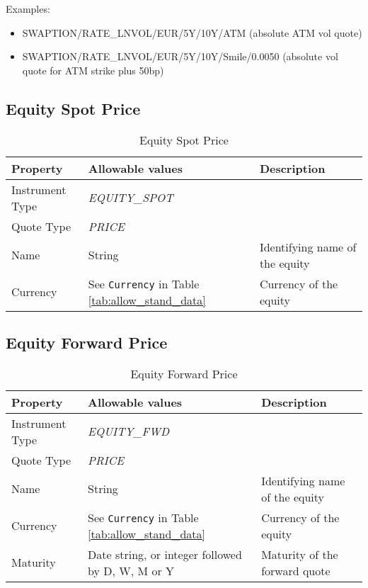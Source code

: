 \medskip
Examples:
\begin{itemize}
\item { SWAPTION/RATE\_LNVOL/EUR/5Y/10Y/ATM} (absolute ATM vol quote)
\item { SWAPTION/RATE\_LNVOL/EUR/5Y/10Y/Smile/0.0050} (absolute vol quote for ATM strike plus 50bp)
\end{itemize}

\subsection{Equity Spot Price}

\begin{table}[H]
    \centering
    \begin{tabular}{|p{3cm}|p{3.5cm}|p{7cm}|}
        \hline
        {\bf Property} & {\bf Allowable values} & {\bf Description} \\ \hline
        Instrument Type & \emph{EQUITY\_SPOT} & \\ \hline
        Quote Type & \emph{PRICE} & \\ \hline
        Name & String & Identifying name of the equity \\ \hline
        Currency & See \lstinline!Currency! in Table \ref{tab:allow_stand_data}&  Currency of the equity \\ \hline
    \end{tabular}
    \caption{Equity Spot Price}
    \label{tab:eqspot_quote}
\end{table}

\subsection{Equity Forward Price}

\begin{table}[H]
    \centering
    \begin{tabular}{|p{3cm}|p{3.5cm}|p{7cm}|}
        \hline
        {\bf Property} & {\bf Allowable values} & {\bf Description} \\ \hline
        Instrument Type & \emph{EQUITY\_FWD} & \\ \hline
        Quote Type & \emph{PRICE} & \\ \hline
        Name & String & Identifying name of the equity \\ \hline
        Currency & See \lstinline!Currency! in Table \ref{tab:allow_stand_data}&  Currency of the equity \\ \hline
        Maturity & Date string, or integer followed by D, W, M or Y & Maturity of the forward quote \\ \hline
    \end{tabular}
    \caption{Equity Forward Price}
    \label{tab:eqfwd_quote}
\end{table}

